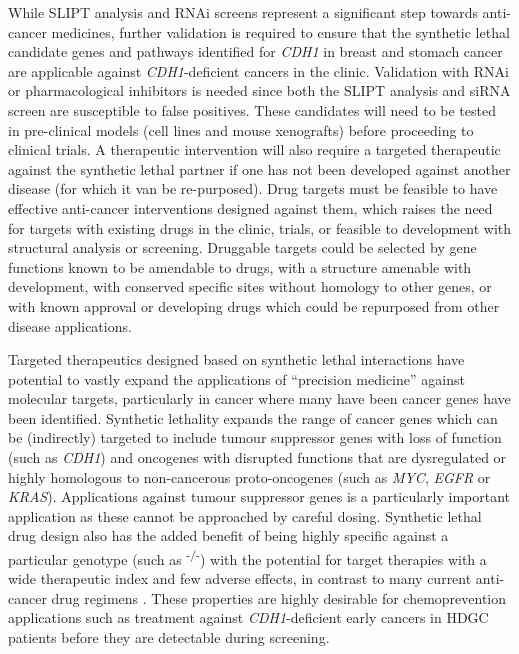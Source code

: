 While \gls{SLIPT} analysis and \gls{RNAi} screens represent a significant step towards anti-cancer medicines, further validation is required to ensure that the synthetic lethal candidate genes and pathways identified for \textit{CDH1} in breast and stomach cancer are applicable against \textit{CDH1}-deficient cancers in the clinic.  Validation with \gls{RNAi} or pharmacological inhibitors is needed since both the \gls{SLIPT} analysis and \gls{siRNA} screen are susceptible to false positives. These candidates will need to be tested in pre-clinical models (cell lines and mouse xenografts) before proceeding to clinical trials. A therapeutic intervention will also require a targeted therapeutic against the synthetic lethal partner if one has not been developed against another disease (for which it van be re-purposed). Drug targets must be feasible to have effective anti-cancer interventions designed against them, which raises the need for targets with existing drugs in the clinic, trials, or feasible to development with structural analysis or screening.  Druggable targets could be selected by gene functions known to be amendable to drugs, with a structure amenable with development, with conserved specific sites without homology to other genes, or with known approval or developing drugs which could be repurposed from other disease applications.

Targeted therapeutics designed based on synthetic lethal interactions have potential to vastly expand the applications of ``precision medicine'' against molecular targets, particularly in cancer where many have been cancer genes have been identified. Synthetic lethality expands the range of cancer genes which can be (indirectly) targeted to include tumour suppressor genes with loss of function (such as \textit{CDH1}) and oncogenes with disrupted functions that are dysregulated or highly homologous to non-cancerous proto-oncogenes (such as \textit{MYC}, \textit{EGFR} or \textit{KRAS}). Applications against tumour suppressor genes is a particularly important application as these cannot be approached by careful dosing. Synthetic lethal drug design also has the added benefit of being highly specific against a particular genotype (such as \textsuperscript{-/-}) with the potential for target therapies with a wide therapeutic index and few adverse effects, in contrast to many current anti-cancer drug regimens \citep{Hopkins2008, Kaelin2009}. These properties are highly desirable for chemoprevention applications such as treatment against \textit{CDH1}-deficient early cancers in \gls{HDGC} patients before they are detectable during screening.

